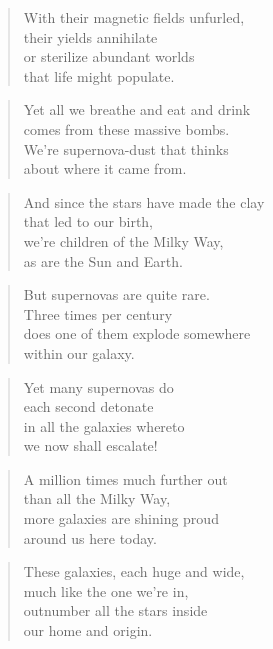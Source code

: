 \documentclass[10pt,a4paper]{article}
\begin{document}
\begin{paracol}{2}
\begin{verse}
With their magnetic fields unfurled,\\
their yields annihilate\\
or sterilize abundant worlds\\
that life might populate.
\end{verse}

\begin{verse}
Yet all we breathe and eat and drink\\
comes from these massive bombs.\\
We’re supernova-dust that thinks\\
about where it came from.
\end{verse}

\begin{verse}
And since the stars have made the clay\\
that led to our birth,\\
we’re children of the Milky Way,\\
as are the Sun and Earth.
\end{verse}

\begin{verse}
But supernovas are quite rare.\\
Three times per century\\
does one of them explode somewhere\\
within our galaxy.
\end{verse}

\begin{verse}
Yet many supernovas do\\
each second detonate\\
in all the galaxies whereto\\
we now shall escalate!
\end{verse}

\begin{verse}
A million times much further out\\
than all the Milky Way,\\
more galaxies are shining proud\\
around us here today.
\end{verse}

\begin{verse}
These galaxies, each huge and wide,\\
much like the one we’re in,\\
outnumber all the stars inside\\
our home and origin.
\end{verse}


\end{paracol}
\end{document}

